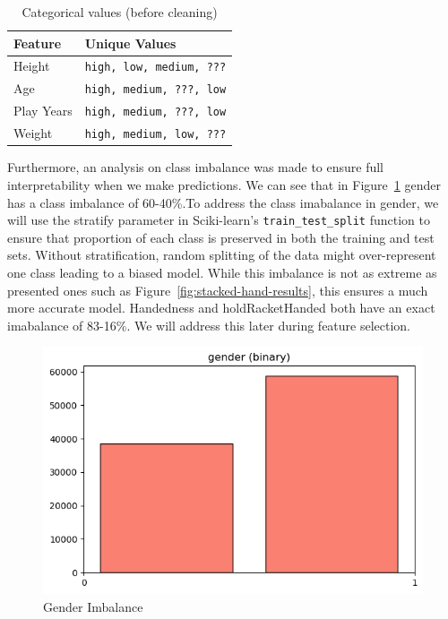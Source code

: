 \documentclass[10pt,twocolumn]{article}
\begin{document}
\begin{table}[H]
\centering
\caption{Categorical values (before cleaning)}
\begin{tabular}{|l|l|}
\hline
\textbf{Feature} & \textbf{Unique Values} \\
\hline
Height     & \texttt{high, low, medium, ???} \\
Age        & \texttt{high, medium, ???, low} \\
Play Years & \texttt{high, medium, ???, low} \\
Weight     & \texttt{high, medium, low, ???} \\
\hline
\end{tabular}
\label{tab:cat-values}
\end{table}
Furthermore, an analysis on class imbalance was made to ensure full interpretability when we make predictions. We can see that in Figure~\ref{fig:stacked-results} gender has a class imbalance of 60-40\%.To address the class imabalance in gender, we will use the stratify parameter in Sciki-learn's \texttt{train\_test\_split}
 function to ensure that proportion of each class is preserved in both the training and test sets. Without stratification, random splitting of the data might over-represent one class leading to a biased model. While this imbalance is not as extreme as  presented ones such as Figure~\ref{fig:stacked-hand-results}, this ensures a much more accurate model. Handedness and holdRacketHanded both have an exact imabalance of 83-16\%. We will address this later during feature selection.

\begin{figure}[H]
    \centering
    \includegraphics[width=0.85\linewidth]{gender.png}
    \caption{Gender Imbalance}
    \label{fig:stacked-results}
\end{figure}
\end{document}

